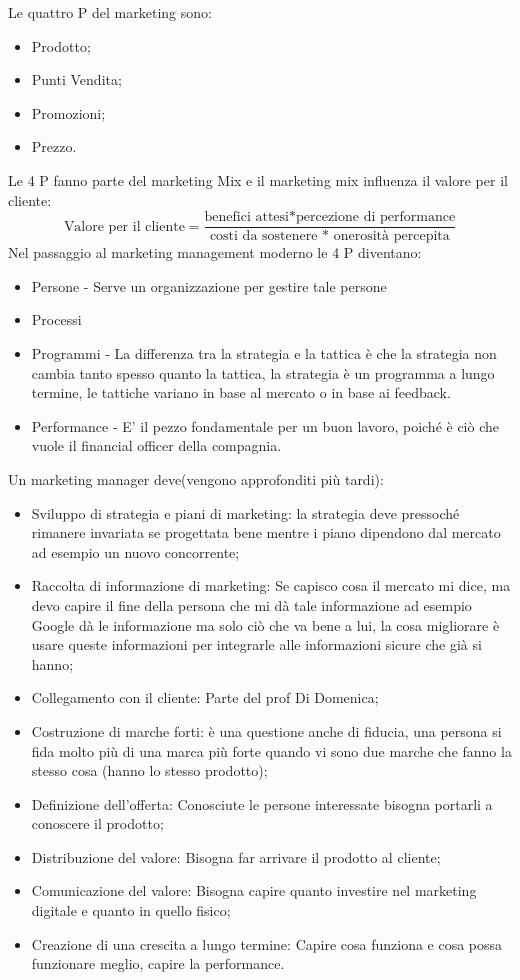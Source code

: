 \documentclass[11pt]{article}
\begin{document}
Le quattro P del marketing sono:
\begin{itemize}[noitemsep,topsep=0ex]
	\item Prodotto;
	\item Punti Vendita; 
	\item Promozioni;
	\item Prezzo.
\end{itemize}
Le 4 P fanno parte del marketing Mix e il marketing mix influenza il valore per il cliente:
\[
\text{Valore per il cliente} = \dfrac{\text{benefici attesi*percezione di performance}}{\text{costi da sostenere * onerosità percepita}}
\]
Nel passaggio al marketing management moderno le 4 P diventano:
\begin{itemize}[noitemsep,topsep=0ex]
	\item Persone - Serve un organizzazione per gestire tale persone
	\item Processi
	\item Programmi - La differenza tra la strategia e la tattica è che la strategia non cambia tanto spesso quanto la tattica, la strategia è un programma a lungo termine, le tattiche variano in base al mercato o in base ai feedback.
	\item Performance - E' il pezzo fondamentale per un buon lavoro, poiché è ciò che vuole il financial officer della compagnia.
\end{itemize}
Un marketing manager deve(vengono approfonditi più tardi):
\begin{itemize}[noitemsep,topsep=0ex]
	\item Sviluppo di strategia e piani di marketing: la strategia deve pressoché rimanere invariata se progettata bene mentre i piano dipendono dal mercato ad esempio un nuovo concorrente;
	\item Raccolta di informazione di marketing: Se capisco cosa il mercato mi dice, ma devo capire il fine della persona che mi dà tale informazione ad esempio Google dà le informazione ma solo ciò che va bene a lui, la cosa migliorare è usare queste informazioni per integrarle alle informazioni sicure che già si hanno;
	\item Collegamento con il cliente: Parte del prof Di Domenica;
	\item Costruzione di marche forti: è una questione anche di fiducia, una persona si fida molto più di una marca più forte quando vi sono due marche che fanno la stesso cosa (hanno lo stesso prodotto);
	\item Definizione dell'offerta: Conosciute le persone interessate bisogna portarli a conoscere il prodotto;
	\item Distribuzione del valore: Bisogna far arrivare il prodotto al cliente;
	\item Comunicazione del valore: Bisogna capire quanto investire nel marketing digitale e quanto in quello fisico;
	\item Creazione di una crescita a lungo termine: Capire cosa funziona e cosa possa funzionare meglio, capire la performance.
\end{itemize}
\end{document}
